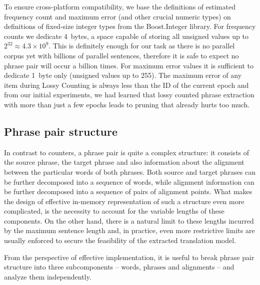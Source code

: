 To ensure cross-platform compatibility, we base the definitions of estimated frequency count and
maximum error (and other crucial numeric types) on definitions of fixed-size integer types from
the Boost.Integer library.
For frequency counts we dedicate 4~bytes, a space capable of storing all unsigned values up to
$2^{32} \approx 4.3 \times 10^9$. This is definitely enough for our task as there is no
parallel corpus yet with billions of parallel sentences, therefore it is safe to expect no phrase
pair will occur a billion times.
For maximum error values it is sufficient to dedicate 1~byte only (unsigned values up to 255).
The maximum error of any item during Lossy Counting is always less than the ID of the current epoch and
from our initial experiments, we had learned that lossy counted phrase extraction with more than just
a few epochs leads to pruning that already hurts too much.

\subsection{Phrase pair structure}


In contrast to counters, a phrase pair is quite a complex structure: it consists of the source phrase,
the target phrase and also information about the alignment between the particular words of both phrases.
Both source and target phrases can be further decomposed into a sequence of words, while alignment
information can be further decomposed into a sequence of pairs of alignment points.
What makes the design of effective in-memory representation of such a structure even more complicated,
is the necessity to account for the variable lengths of these components.
On the other hand, there is a natural limit to these lengths incurred by the maximum sentence length and,
in practice, even more restrictive limits are usually enforced to secure the feasibility of the
extracted translation model.

From the perspective of effective implementation, it is useful to break phrase pair
structure into three subcomponents -- words, phrases and alignments -- and analyze them
independently.



